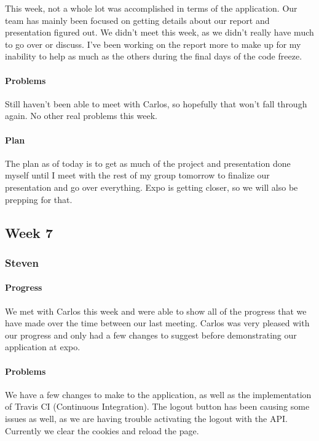 \documentclass[onecolumn, draftclsnofoot,10pt, compsoc]{IEEEtran}
\begin{document}
	This week, not a whole lot was accomplished in terms of the application. Our team has mainly been focused on getting details about our report and presentation figured out. We didn't meet this week, as we didn't really have much to go over or discuss. I've been working on the report more to make up for my inability to help as much as the others during the final days of the code freeze.
	
	\paragraph{Problems}
	
	Still haven't been able to meet with Carlos, so hopefully that won't fall through again. No other real problems this week.
	
	\paragraph{Plan}
	
	The plan as of today is to get as much of the project and presentation done myself until I meet with the rest of my group tomorrow to finalize our presentation and go over everything. Expo is getting closer, so we will also be prepping for that.
\subsection{Week 7}
	\subsubsection{Steven}
	
	\paragraph{Progress}
	We met with Carlos this week and were able to show all of the progress that we have made over the time between our last meeting. Carlos was very pleased with our progress and only had a few changes to suggest before demonstrating our application at expo.
	
	\paragraph{Problems}
	We have a few changes to make to the application, as well as the implementation of Travis CI (Continuous Integration). The logout button has been causing some issues as well, as we are having trouble activating the logout with the API. Currently we clear the cookies and reload the page.
	
\end{document}
